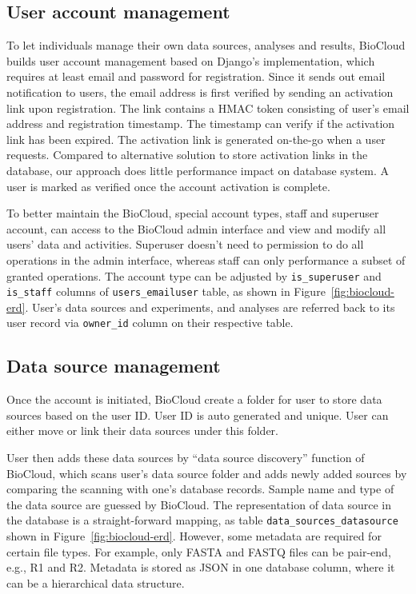 \subsection{User account management}

To let individuals manage their own data sources, analyses and results,
BioCloud builds user account management based on Django's implementation, which
requires at least email and password for registration. Since it sends out email
notification to users, the email address is first verified by sending an
activation link upon registration. The link contains a HMAC token consisting of
user's email address and registration timestamp. The timestamp can verify if
the activation link has been expired. The activation link is generated
on-the-go when a user requests. Compared to alternative solution to store
activation links in the database, our approach does little performance impact
on database system. A user is marked as verified once the account activation is
complete.

To better maintain the BioCloud, special account types, staff and superuser
account, can access to the BioCloud admin interface and view and modify all
users' data and activities. Superuser doesn't need to permission to do all
operations in the admin interface, whereas staff can only performance a subset
of granted operations. The account type can be adjusted by
\texttt{is\_superuser} and \texttt{is\_staff} columns of
\texttt{users\_emailuser} table, as shown in Figure~\ref{fig:biocloud-erd}.
User's data sources and experiments, and analyses are referred back to its user
record via \texttt{owner\_id} column on their respective table.


\subsection{Data source management}

Once the account is initiated, BioCloud create a folder for user to store
data sources based on the user ID. User ID is auto generated and unique. User
can either move or link their data sources under this folder.

User then adds these data sources by ``data source discovery'' function of
BioCloud, which scans user's data source folder and adds newly added sources by
comparing the scanning with one's database records. Sample name and type of the
data source are guessed by BioCloud. The representation of data source in the
database is a straight-forward mapping, as table
\texttt{data\_sources\_datasource} shown in Figure~\ref{fig:biocloud-erd}.
However, some metadata are required for certain file types. For example, only
FASTA and FASTQ files can be pair-end, e.g., R1 and R2. Metadata is stored as
JSON in one database column, where it can be a hierarchical data structure.


